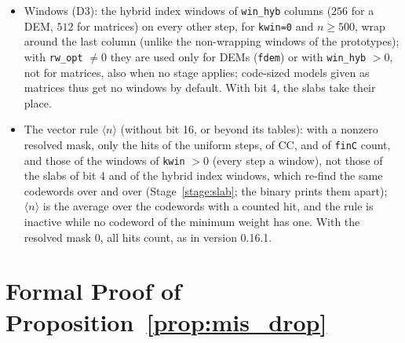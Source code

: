 \documentclass[12pt]{article}
\theoremstyle{definition}
\newcommand{\ttt}[1]{\texttt{#1}}
\begin{document}
\begin{itemize}
  \item Windows (D3): the hybrid index windows of \ttt{win\_hyb} columns ($256$ for a DEM, $512$ for matrices) on
    every other step, for \ttt{kwin=0} and $n \ge 500$, wrap around the last column (unlike the non-wrapping windows
    of the prototypes); with \ttt{rw\_opt} $\neq 0$ they are used only for DEMs (\ttt{fdem}) or with
    \ttt{win\_hyb} $> 0$, not for matrices, also when no stage applies; code-sized models given as matrices thus get
    no windows by default. With bit 4, the slabs take their place.
  \item The vector rule $\langle n \rangle$ (without bit 16, or beyond its tables): with a nonzero resolved mask, only
    the hits of the uniform steps, of CC, and of \ttt{finC} count, and those of the windows of \ttt{kwin} $> 0$ (every
    step a window), not those of the slabs of bit 4 and of the hybrid index windows, which re-find the same codewords
    over and over (Stage~\ref{stage:slab}; the binary prints them apart); $\langle n \rangle$ is the average over the
    codewords with a counted hit, and the rule is inactive while no codeword of the minimum weight has one. With the
    resolved mask $0$, all hits count, as in version 0.16.1.
\end{itemize}

\appendix

\section{Formal Proof of \texorpdfstring{Proposition~\ref{prop:mis_drop}}{Proposition 2}}\label{app:drop_proof}
\end{document}
